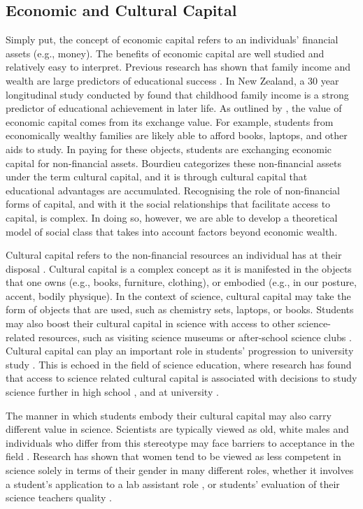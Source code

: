 \subsection*{Economic and Cultural Capital}
Simply put, the concept of economic capital refers to an individuals' financial assets (e.g., money). The benefits of economic capital are well studied and relatively easy to interpret. Previous research has shown that family income and wealth are large predictors of educational success \citep{shapiro2013roots, blanden2004family}. In New Zealand, a 30 year longitudinal study conducted by \citet{gibb2012childhood} found that childhood family income is a strong predictor of educational achievement in later life. As outlined by \cite{Bourdieu_1986}, the value of economic capital comes from its exchange value. For example, students from economically wealthy families are likely able to afford books, laptops, and other aids to study. In paying for these objects, students are exchanging economic capital for non-financial assets. Bourdieu categorizes these non-financial assets under the term cultural capital, and it is through cultural capital that educational advantages are accumulated. Recognising the role of non-financial forms of capital, and with it the social relationships that facilitate access to capital, is complex. In doing so, however, we are able to develop a theoretical model of social class that takes into account factors beyond economic wealth. 

Cultural capital refers to the non-financial resources an individual has at their disposal \citep{Bourdieu_1986}. Cultural capital is a complex concept as it is manifested in the objects that one owns (e.g., books, furniture, clothing), or embodied (e.g., in our posture, accent, bodily physique). In the context of science, cultural capital may take the form of objects that are used, such as chemistry sets, laptops, or books. Students may also boost their cultural capital in science with access to other science-related resources, such as visiting science museums \citep{Dawson2014} or after-school science clubs \citep{mujtaba2018students}. Cultural capital can play an important role in students' progression to university study \citep{aschaffenburg1997cultural}. This is echoed in the field of science education, where research has found that access to science related cultural capital is associated with decisions to study science further in high school \citep{mujtaba2018students}, and at university \citep{Lyons_2006}.

The manner in which students embody their cultural capital may also carry different value in science. Scientists are typically viewed as old, white males \citep{Nosek_2009,Barthelemy_2016} and individuals who differ from this stereotype may face barriers to acceptance in the field \citep{ong2005body}. Research has shown that women tend to be viewed as less competent in science solely in terms of their gender in many different roles, whether it involves a student's application to a lab assistant role \citep{Moss_2012}, or students' evaluation of their science teachers quality \citep{Potvin_2016}. 

